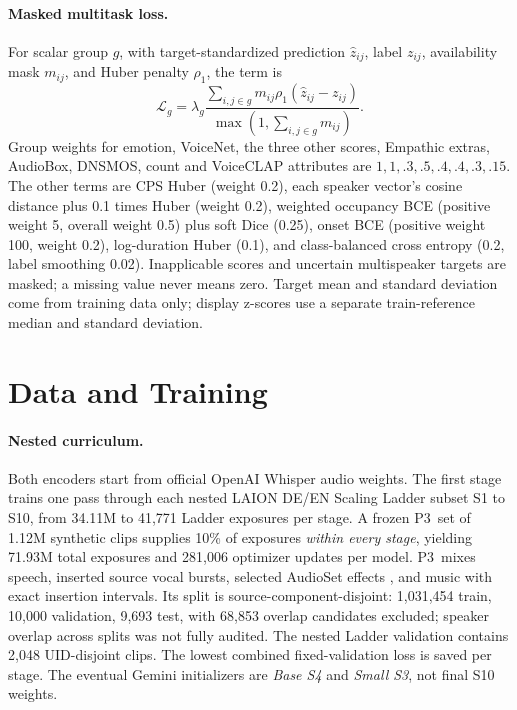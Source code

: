 \documentclass{article}
\newcommand{\pthree}{\textsc{P3}}
\begin{document}
\paragraph{Masked multitask loss.}
For scalar group $g$, with target-standardized prediction $\hat z_{ij}$, label $z_{ij}$, availability mask $m_{ij}$, and Huber penalty $\rho_1$, the term is
\begin{equation}
\mathcal L_g=\lambda_g\frac{\sum_{i,j\in g}m_{ij}\rho_1(\hat z_{ij}-z_{ij})}{\max(1,\sum_{i,j\in g}m_{ij})}.
\end{equation}
Group weights for emotion, VoiceNet, the three other scores, Empathic extras, AudioBox, DNSMOS, count and VoiceCLAP attributes are $1,1,.3,.5,.4,.4,.3,.15$. The other terms are CPS Huber (weight 0.2), each speaker vector's cosine distance plus 0.1 times Huber (weight 0.2), weighted occupancy BCE (positive weight 5, overall weight 0.5) plus soft Dice (0.25), onset BCE (positive weight 100, weight 0.2), log-duration Huber (0.1), and class-balanced cross entropy (0.2, label smoothing 0.02). Inapplicable scores and uncertain multispeaker targets are masked; a missing value never means zero. Target mean and standard deviation come from training data only; display z-scores use a separate train-reference median and standard deviation.

\section{Data and Training}
\paragraph{Nested curriculum.}
Both encoders start from official OpenAI Whisper audio weights. The first stage trains one pass through each nested LAION DE/EN Scaling Ladder subset S1 to S10, from 34.11M to 41,771 Ladder exposures per stage. A frozen \pthree\ set of 1.12M synthetic clips supplies 10\% of exposures \emph{within every stage}, yielding 71.93M total exposures and 281,006 optimizer updates per model. \pthree\ mixes speech, inserted source vocal bursts, selected AudioSet effects \citep{gemmeke2017audioset}, and music with exact insertion intervals. Its split is source-component-disjoint: 1,031,454 train, 10,000 validation, 9,693 test, with 68,853 overlap candidates excluded; speaker overlap across splits was not fully audited. The nested Ladder validation contains 2,048 UID-disjoint clips. The lowest combined fixed-validation loss is saved per stage. The eventual Gemini initializers are \emph{Base S4} and \emph{Small S3}, not final S10 weights.
\end{document}
